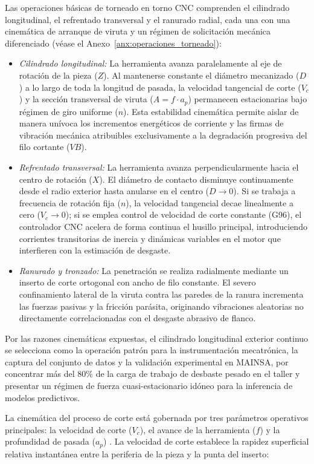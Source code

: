 Las operaciones básicas de torneado en torno CNC comprenden el cilindrado longitudinal, el refrentado transversal y el ranurado radial, cada una con una cinemática de arranque de viruta y un régimen de solicitación mecánica diferenciado (véase el Anexo~\ref{anx:operaciones_torneado}):
\begin{itemize}
    \item \textit{Cilindrado longitudinal:} La herramienta avanza paralelamente al eje de rotación de la pieza ($Z$). Al mantenerse constante el diámetro mecanizado ($D$) a lo largo de toda la longitud de pasada, la velocidad tangencial de corte ($V_c$) y la sección transversal de viruta ($A = f \cdot a_p$) permanecen estacionarias bajo régimen de giro uniforme ($n$). Esta estabilidad cinemática permite aislar de manera unívoca los incrementos energéticos de corriente y las firmas de vibración mecánica atribuibles exclusivamente a la degradación progresiva del filo cortante ($VB$).
    \item \textit{Refrentado transversal:} La herramienta avanza perpendicularmente hacia el centro de rotación ($X$). El diámetro de contacto disminuye continuamente desde el radio exterior hasta anularse en el centro ($D \to 0$). Si se trabaja a frecuencia de rotación fija ($n$), la velocidad tangencial decae linealmente a cero ($V_c \to 0$); si se emplea control de velocidad de corte constante (G96), el controlador CNC acelera de forma continua el husillo principal, introduciendo corrientes transitorias de inercia y dinámicas variables en el motor que interfieren con la estimación de desgaste.
    \item \textit{Ranurado y tronzado:} La penetración se realiza radialmente mediante un inserto de corte ortogonal con ancho de filo constante. El severo confinamiento lateral de la viruta contra las paredes de la ranura incrementa las fuerzas pasivas y la fricción parásita, originando vibraciones aleatorias no directamente correlacionadas con el desgaste abrasivo de flanco.
\end{itemize}

Por las razones cinemáticas expuestas, el cilindrado longitudinal exterior continuo se selecciona como la operación patrón para la instrumentación mecatrónica, la captura del conjunto de datos y la validación experimental en MAINSA, por concentrar más del 80\% de la carga de trabajo de desbaste pesado en el taller y presentar un régimen de fuerza cuasi-estacionario idóneo para la inferencia de modelos predictivos.

La cinemática del proceso de corte está gobernada por tres parámetros operativos principales: la velocidad de corte ($V_c$), el avance de la herramienta ($f$) y la profundidad de pasada ($a_p$) \citep{kalpakjian2014}. La velocidad de corte establece la rapidez superficial relativa instantánea entre la periferia de la pieza y la punta del inserto:

